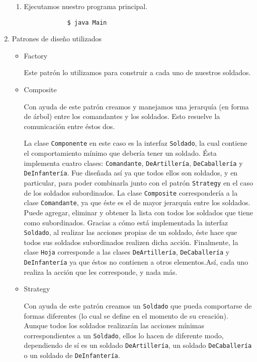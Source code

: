 \documentclass[letterpaper,11pt]{article}
\begin{document}
\begin{enumerate}
\begin{enumerate}
        \item Ejecutamos nuestro programa principal.
        \begin{verbatim}
            $ java Main 
        \end{verbatim}
    \end{enumerate}

    \item Patrones de diseño utilizados
    \begin{itemize}
        \item Factory
        
        Este patrón lo utilizamos para construir a cada uno de nuestros 
        soldados.

        \item Composite

        Con ayuda de este patrón creamos y manejamos una jerarquía (en forma 
        de árbol) entre los comandantes y los soldados. Esto resuelve la 
        comunicación entre éstos dos. 

        La clase \texttt{Componente} en este caso es la interfaz 
        \texttt{Soldado}, la cual contiene el comportamiento mínimo que debería 
        tener un soldado. Ésta implementa cuatro clases: \texttt{Comandante}, 
        \texttt{DeArtillería}, \texttt{DeCaballería} y \texttt{DeInfantería}. 
        Fue diseñada así ya que todos ellos son soldados, y en particular, para 
        poder combinarla junto con el patrón \texttt{Strategy} en el caso de 
        los soldados subordinados. La clase \texttt{Composite} correspondería a 
        la clase \texttt{Comandante}, ya que éste es el de mayor jerarquía entre 
        los soldados. Puede agregar, eliminar y obtener la lista con todos los 
        soldados que tiene como subordinados. Gracias a cómo está implementada
        la interfaz \texttt{Soldado}, al realizar las acciones propias de un 
        soldado, éste hace que todos sus soldados subordinados realizen dicha 
        acción. Finalmente, la clase \texttt{Hoja} corresponde a las clases 
        \texttt{DeArtillería}, \texttt{DeCaballería} y \texttt{DeInfantería}
        ya que éstos no contienen a otros elementos.Así, cada uno realiza 
        la acción que les corresponde, y nada más.

        \item Strategy 

        Con ayuda de este patrón creamos un \texttt{Soldado} que pueda 
        comportarse de formas diferentes (lo cual se define en el momento 
        de su creación). Aunque todos los soldados realizarán las acciones 
        mínimas correspondientes a un \texttt{Soldado}, ellos lo hacen de 
        diferente modo, dependiendo de sí es un soldado \texttt{DeArtillería}, 
        un soldado \texttt{DeCaballería} o un soldado de \texttt{DeInfantería}.


\end{itemize}
\end{enumerate}
\end{document}
